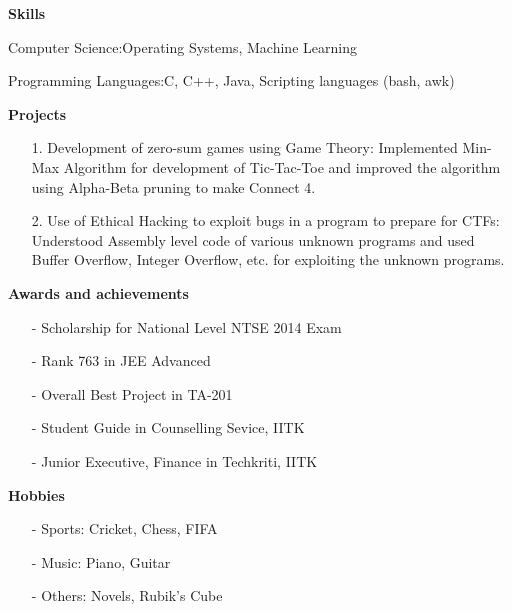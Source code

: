 \documentclass{article}
\begin{document}
\vspace{0.5cm}
\par
\textbf{Skills}
\vspace{0.2cm}
\par
Computer Science\hspace{1.5cm}:\hspace{0.5cm}Operating Systems, Machine Learning
\par
Programming Languages\hspace{0.5cm}:\hspace{0.5cm}C, C++, Java, Scripting languages (bash, awk)
\vspace{0.5cm}
\par
\textbf{Projects}
\begin{itemize}
\item[1.] Development of zero-sum games using Game Theory: Implemented Min-Max Algorithm for development of Tic-Tac-Toe and improved the algorithm using Alpha-Beta pruning to make Connect 4.
\item[2.] Use of Ethical Hacking to exploit bugs in a program to prepare for CTFs: Understood Assembly level code of various unknown programs and used Buffer Overflow, Integer Overflow, etc. for exploiting the unknown programs.
\end{itemize}
\par
\textbf{Awards and achievements}
\begin{itemize}
\item[-] Scholarship for National Level NTSE 2014 Exam
\item[-] Rank 763 in JEE Advanced
\item[-] Overall Best Project in TA-201
\item[-] Student Guide in Counselling Sevice, IITK
\item[-] Junior Executive, Finance in Techkriti, IITK
\end{itemize}
\par
\textbf{Hobbies}
\begin{itemize}
\item[-] Sports: Cricket, Chess, FIFA
\item[-] Music: Piano, Guitar
\item[-] Others: Novels, Rubik's Cube
\end{itemize}
\end{document}
